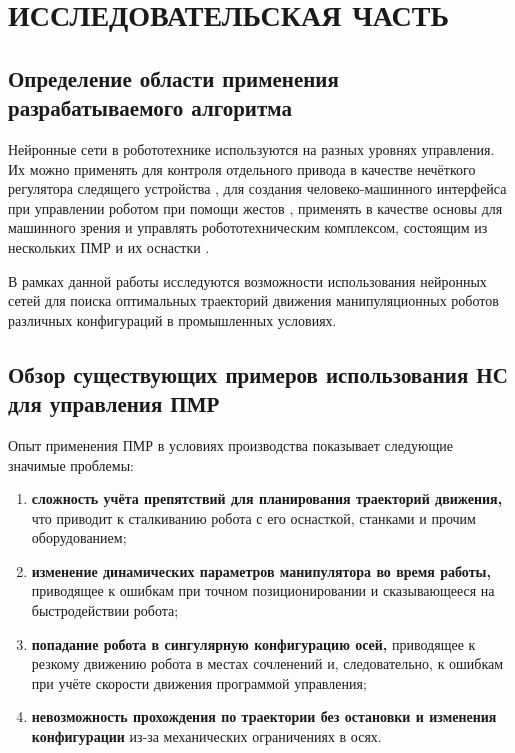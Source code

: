 \newpage
\section{ИССЛЕДОВАТЕЛЬСКАЯ ЧАСТЬ}
\subsection{\textbf{Определение области применения разрабатываемого алгоритма}}
Нейронные сети в робототехнике используются на разных уровнях управления. Их можно применять для контроля отдельного привода в качестве нечёткого регулятора следящего устройства \cite{Single_Link_Control}, для создания человеко-машинного интерфейса при управлении роботом при помощи жестов \cite{Neto_Pires_Moreira_2009}, применять в качестве основы для машинного зрения и управлять робототехническим комплексом, состоящим из нескольких ПМР и их оснастки \cite{Jiang_Yang_Na_Li_Li_Zhong_2017}.

В рамках данной работы исследуются возможности использования нейронных сетей для поиска оптимальных траекторий движения манипуляционных роботов различных конфигураций в промышленных условиях.


\subsection{\textbf{Обзор существующих примеров использования НС для управления ПМР}}

Опыт применения ПМР в условиях производства показывает следующие значимые проблемы:
\begin{enumerate}[label=\arabic*)]
    \item \textbf{сложность учёта препятствий для планирования траекторий движения,} что приводит к сталкиванию робота с его оснасткой, станками и прочим оборудованием;
    \item \textbf{изменение динамических параметров манипулятора во время работы,} приводящее к ошибкам при точном позиционировании и сказывающееся на быстродействии робота;
    \item \textbf{попадание робота в сингулярную конфигурацию осей,} приводящее к резкому движению робота в местах сочленений и, следовательно, к ошибкам при учёте скорости движения программой управления;
    \item \textbf{невозможность прохождения по траектории без остановки и изменения конфигурации} из-за механических ограничениях в осях.
\end{enumerate}

